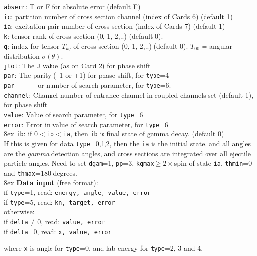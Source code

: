 \documentclass[11pt]{article}
\begin{document}
{\tt abserr}: T or F for absolute error (default F)\\
{\tt ic}: partition number of cross section channel (index of Cards 6)  (default 1)\\
{\tt ia}: excitation pair number of cross section (index of Cards 7)  (default 1)\\
{\tt k}: tensor rank of cross section (0, 1, 2,..) (default 0). \\
{\tt q}: index for tensor $T_{kq}$ of cross section (0, 1, 2,..) (default 0).
    $T_{00}$ = angular distribution $\sigma(\theta)$.\\
{\tt jtot}: The {\tt J} value (as on Card 2) for phase shift\\
{\tt par}: The parity (--1 or +1) for phase shift, for {\tt type}=4\\
{\tt par}~~~~~~ or number of search parameter, for {\tt type}=6.\\
{\tt channel}: Channel number of entrance channel in coupled channels set (default 1),
for phase shift\\
{\tt value}: Value of search parameter, for {\tt type}=6\\
{\tt error}: Error in value of search parameter, for {\tt type}=6\\

\hangindent 8ex
{\tt ib}: if 0$<${\tt ib}$<${\tt ia}, then {\tt ib} is final state of gamma decay. (default 0)\\
     If this is given for data {\tt type}=0,1,2, then the {\tt ia} is the initial state, and 
     all angles are the {\em  gamma} detection angles, and cross sections are integrated over all ejectile particle angles.
     Need to set {\tt dgam}=1, {\tt pp}=3, {\tt kqmax}$\geq 2\times$spin of state {\tt ia}, 
        {\tt thmin}=0 and {\tt thmax}=180 degrees.\\
       
       
\hangindent 8ex
{\bf Data input} (free format):
\\ if {\tt type}=1, read:  {\tt energy, angle, value, error}
\\ if {\tt type}=5, read:  {\tt kn, target, error}
\\ otherwise:
\\ if {\tt delta}$\ne$0, read:  {\tt value, error}
\\ if {\tt delta}=0, read:  {\tt x, value, error}


where {\tt x} is angle for {\tt type}=0, and lab energy for {\tt type}=2, 3 and 4.
\end{document}
